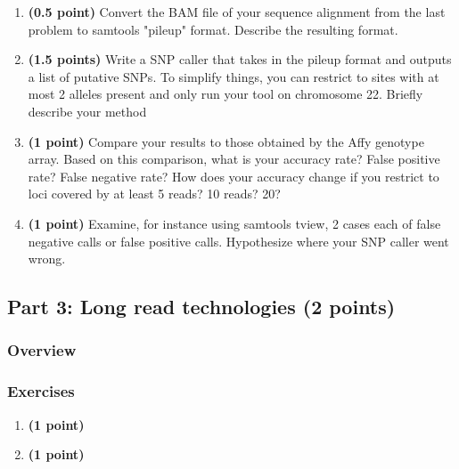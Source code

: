 \documentclass[12pt]{article}
\begin{document}
\begin{enumerate}
\item \textbf{(0.5 point)} Convert the BAM file of your sequence alignment from the last problem to samtools "pileup" format. Describe the resulting format.

\item \textbf{(1.5 points)} Write a SNP caller that takes in the pileup format and outputs a list of putative SNPs. To simplify things, you can restrict to sites with at most 2 alleles present and only run your tool on chromosome 22. Briefly describe your method

\item \textbf{(1 point)} Compare your results to those obtained by the Affy genotype array. Based on this comparison, what is your accuracy rate? False positive rate? False negative rate? How does your accuracy change if you restrict to loci covered by at least 5 reads? 10 reads? 20?

\item \textbf{(1 point)} Examine, for instance using samtools tview, 2 cases each of false negative calls or false positive calls. Hypothesize where your SNP caller went wrong.

\end{enumerate}

\subsection*{Part 3: Long read technologies (2 points)}
\subsubsection*{Overview}
\subsubsection*{Exercises}
\begin{enumerate}
	\item \textbf{(1 point)} %
	\item \textbf{(1 point)} %
\end{enumerate}
\end{document}
